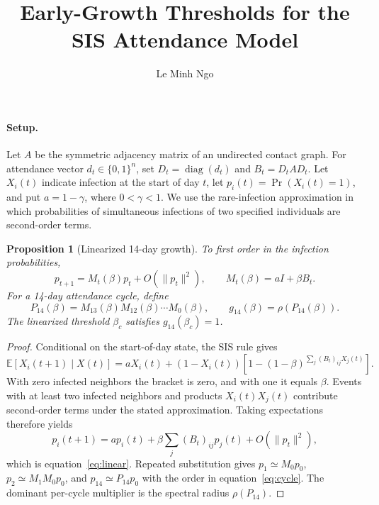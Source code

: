 \documentclass[11pt]{article}
\title{Early-Growth Thresholds for the SIS Attendance Model}
\author{Le Minh Ngo}
\date{}
\newtheorem{proposition}{Proposition}
\begin{document}
\maketitle

\paragraph{Setup.}
Let $A$ be the symmetric adjacency matrix of an undirected contact graph.
For attendance vector $d_t\in\{0,1\}^n$, set
$D_t=\operatorname{diag}(d_t)$ and $B_t=D_tAD_t$. Let $X_i(t)$ indicate
infection at the start of day $t$, let $p_i(t)=\Pr(X_i(t)=1)$, and put
$a=1-\gamma$, where $0<\gamma<1$. We use the rare-infection approximation
in which probabilities of simultaneous infections of two specified
individuals are second-order terms.

\begin{proposition}[Linearized 14-day growth]
To first order in the infection probabilities,
\begin{equation}
    p_{t+1}=M_t(\beta)p_t+O(\|p_t\|^2),
    \qquad M_t(\beta)=aI+\beta B_t.
    \label{eq:linear}
\end{equation}
For a 14-day attendance cycle, define
\begin{equation}
    P_{14}(\beta)=M_{13}(\beta)M_{12}(\beta)\cdots M_0(\beta),
    \qquad g_{14}(\beta)=\rho(P_{14}(\beta)).
    \label{eq:cycle}
\end{equation}
The linearized threshold $\beta_c$ satisfies $g_{14}(\beta_c)=1$.
\end{proposition}

\begin{proof}
Conditional on the start-of-day state, the SIS rule gives
\begin{equation}
\mathbb E[X_i(t+1)\mid X(t)]
=aX_i(t)+(1-X_i(t))
\left[1-(1-\beta)^{\sum_j(B_t)_{ij}X_j(t)}\right].
\end{equation}
With zero infected neighbors the bracket is zero, and with one it equals
$\beta$. Events with at least two infected neighbors and products
$X_i(t)X_j(t)$ contribute second-order terms under the stated
approximation. Taking expectations therefore yields
\[
p_i(t+1)=ap_i(t)+\beta\sum_j(B_t)_{ij}p_j(t)
+O(\|p_t\|^2),
\]
which is equation~\eqref{eq:linear}. Repeated substitution gives
$p_1\simeq M_0p_0$, $p_2\simeq M_1M_0p_0$, and
$p_{14}\simeq P_{14}p_0$ with the order in equation~\eqref{eq:cycle}.
The dominant per-cycle multiplier is the spectral radius $\rho(P_{14})$.
\end{proof}
\end{document}
